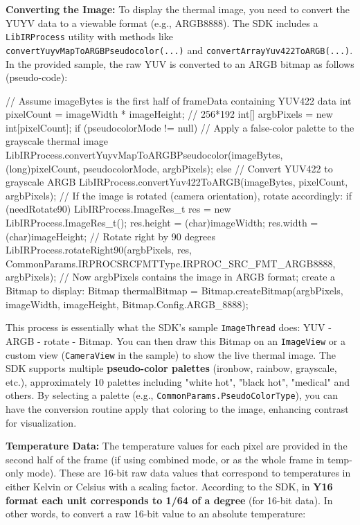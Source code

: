 {\textbf{Converting the Image:} To display the thermal image, you need to
convert the YUYV data to a viewable format (e.g., ARGB8888). The SDK
includes a \texttt{LibIRProcess} utility with methods like
\texttt{convertYuyvMapToARGBPseudocolor(...)} and
\texttt{convertArrayYuv422ToARGB(...)}\cite{ContactlessStressThermal2022}.
In the provided sample, the raw YUV is converted to an ARGB bitmap as
follows (pseudo-code):

    // Assume imageBytes is the first half of frameData containing YUV422 data
    int pixelCount = imageWidth * imageHeight;  // 256*192
    int[] argbPixels = new int[pixelCount];
    if (pseudocolorMode != null) {
        // Apply a false-color palette to the grayscale thermal image
        LibIRProcess.convertYuyvMapToARGBPseudocolor(imageBytes, (long)pixelCount,
                                                    pseudocolorMode, argbPixels);
    } else {
        // Convert YUV422 to grayscale ARGB
        LibIRProcess.convertYuv422ToARGB(imageBytes, pixelCount, argbPixels);
    }
    // If the image is rotated (camera orientation), rotate accordingly:
    if (needRotate90) {
        LibIRProcess.ImageRes_t res = new LibIRProcess.ImageRes_t();
        res.height = (char)imageWidth;
        res.width  = (char)imageHeight;
        // Rotate right by 90 degrees
        LibIRProcess.rotateRight90(argbPixels, res, CommonParams.IRPROCSRCFMTType.IRPROC_SRC_FMT_ARGB8888, argbPixels);
    }
    // Now argbPixels contains the image in ARGB format; create a Bitmap to display:
    Bitmap thermalBitmap = Bitmap.createBitmap(argbPixels, imageWidth, imageHeight, Bitmap.Config.ARGB_8888);

This process is essentially what the SDK's sample \texttt{ImageThread} does:
YUV -\> ARGB -\> rotate -\>
Bitmap\cite{ContactlessStressThermal2022}\cite{ContactlessStressThermal2022}.
You can then draw this Bitmap on an \texttt{ImageView} or a custom view
(\texttt{CameraView} in the sample) to show the live thermal image. The SDK
supports multiple \textbf{pseudo-color palettes} (ironbow, rainbow,
grayscale, etc.), approximately 10 palettes including "white hot",
"black hot", "medical" and
others\cite{InstantStressSmartphone2019}.
By selecting a palette (e.g., \texttt{CommonParams.PseudoColorType}), you can
have the conversion routine apply that coloring to the image, enhancing
contrast for visualization.

\textbf{Temperature Data:} The temperature values for each pixel are provided
in the second half of the frame (if using combined mode, or as the whole
frame in temp-only mode). These are 16-bit raw data values that
correspond to temperatures in either Kelvin or Celsius with a scaling
factor. According to the SDK, in \textbf{Y16 format each unit corresponds to
1/64 of a degree} (for 16-bit
data)\cite{InstantStressSmartphone2019}.
In other words, to convert a raw 16-bit value to an absolute
temperature:

}
